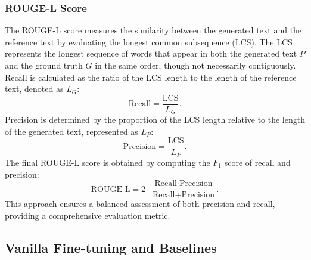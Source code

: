 \subsubsection{ROUGE-L Score}
The ROUGE-L score measures the similarity between the generated text and the reference text by evaluating the longest common subsequence (LCS). The LCS represents the longest sequence of words that appear in both the generated text $P$ and the ground truth $G$ in the same order, though not necessarily contiguously. Recall is calculated as the ratio of the LCS length to the length of the reference text, denoted as $L_G$:
\begin{equation}
    \text{Recall} = \frac{\text{LCS}}{L_G}.
\end{equation}
Precision is determined by the proportion of the LCS length relative to the length of the generated text, represented as $L_P$:
\begin{equation}
    \text{Precision} = \frac{\text{LCS}}{L_P}.
\end{equation}
The final ROUGE-L score is obtained by computing the $F_1$ score of recall and precision:
\begin{equation}
    \text{ROUGE-L} = 2 \cdot \frac{\text{Recall} \cdot \text{Precision}}{\text{Recall} + \text{Precision}}.
\end{equation}
This approach ensures a balanced assessment of both precision and recall, providing a comprehensive evaluation metric.

\subsection{Vanilla Fine-tuning and Baselines}\label{app:formula}
